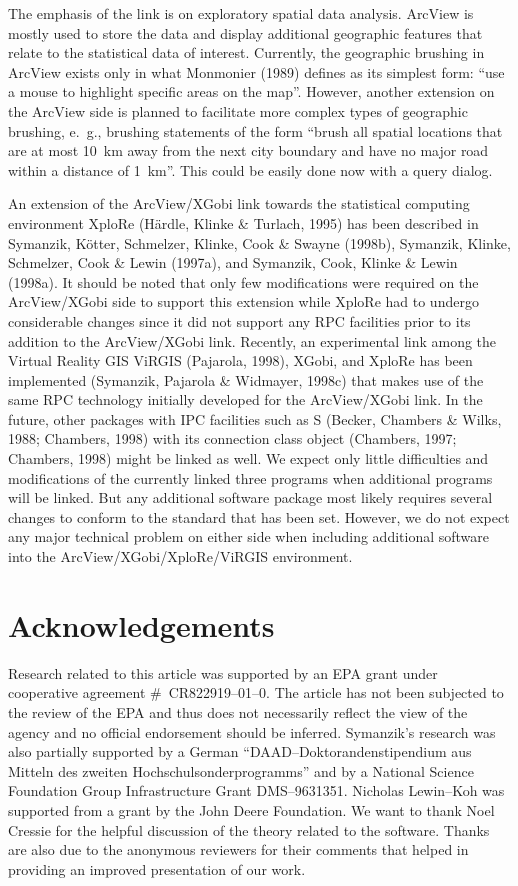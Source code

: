 The emphasis of the link is on exploratory
spatial data analysis. ArcView is mostly used to store the data and
display additional geographic features that relate to the statistical
data of interest.  
Currently, the geographic brushing in ArcView exists only
in what Monmonier (1989) defines as its simplest form: ``use a mouse
to highlight specific areas on the map''. 
However, another extension on the ArcView side is
planned to facilitate more complex types of geographic
brushing, e.~g., brushing statements of the form 
``brush all spatial
locations that are at most 10~km away from the next city boundary and
have no major road within a distance of 1~km''. 
This could be easily done now with a query dialog.

An extension of the ArcView/XGobi link towards the statistical
computing environment XploRe (H\"ardle, Klinke \& Turlach, 1995) has
been described in Symanzik, K{\"o}tter, Schmelzer, Klinke, Cook \&
Swayne (1998b), Symanzik, Klinke, Schmelzer, Cook \& Lewin (1997a),
and Symanzik, Cook, Klinke \& Lewin (1998a).  It should be noted that
only few modifications were required on the ArcView/XGobi side to
support this extension while XploRe had to undergo considerable
changes since it did not support any RPC facilities prior to its
addition to the ArcView/XGobi link.  
Recently, an experimental link among the Virtual Reality GIS ViRGIS
(Pajarola, 1998), XGobi, and XploRe has been implemented
(Symanzik, Pajarola \& Widmayer, 1998c) that makes use of the same
RPC technology initially developed for the ArcView/XGobi link.
In the future, other packages
with IPC facilities such as S (Becker, Chambers \& Wilks, 1988;
Chambers, 1998) with its connection class object 
(Chambers, 1997; Chambers, 1998) might be linked as well.
We expect only little difficulties and modifications of the currently
linked three programs when additional programs will be linked.  But
any additional software package most likely requires several changes
to conform to the standard that has been set. However, we do not
expect any major technical problem on either side when including
additional software into the ArcView/XGobi/XploRe/ViRGIS environment.  


\section*{Acknowledgements}

Research related to this article was supported by an EPA grant under
cooperative agreement \#~CR822919--01--0.  The article has not been
subjected to the review of the EPA and thus does not necessarily
reflect the view of the agency and no official endorsement should be
inferred.  Symanzik's research was also partially supported by a
German ``DAAD--Doktorandenstipendium aus Mitteln des zweiten
Hochschulsonderprogramms'' and by a National Science Foundation Group
Infrastructure Grant DMS--9631351. Nicholas Lewin--Koh was supported from a
grant by the John Deere Foundation.  We want to thank Noel Cressie for
the helpful discussion of the theory related to the software. Thanks
are also due to the anonymous reviewers for their comments that helped
in providing an improved presentation of our work.

